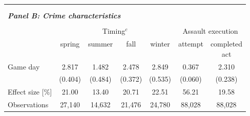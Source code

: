 \begin{table}[ht]
\begin{threeparttable}
{\begin{tabular}{l*{6}{c}}
				\\\\\\
				\multicolumn{6}{l}{\textit{\textbf{Panel B: Crime characteristics}}} \\\\
				& \multicolumn{4}{c}{Timing$^c$} & \multicolumn{2}{c}{Assault execution} \\
				\cmidrule(lr){2-5} \cmidrule(lr){6-7}
				& spring & summer & fall & winter & attempt & \clb{c}{completed\\act} \\
				\midrule
				Game day            	 &     2.817\sym{***}&       1.482\sym{**} &       2.478\sym{***}&       2.849\sym{***}&       0.367\sym{***}&       2.310\sym{***}\\
										 &   (0.404)         &     (0.484)         &     (0.372)         &     (0.535)         &     (0.060)         &     (0.238)         \\
				Effect size [\%]&     21.00         &       13.40         &       20.71         &       22.51         &       56.21         &       19.58         \\
				Observations        	 &    27,140         &      14,632         &      21,476         &      24,780         &      88,028         &      88,028         \\
				

\end{tabular}}
\end{threeparttable}
\end{table}
